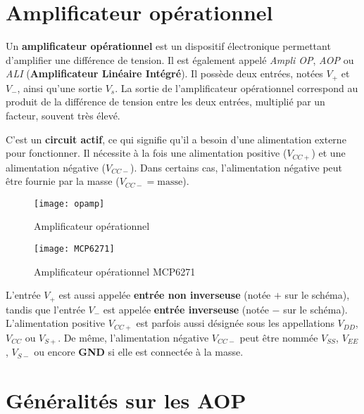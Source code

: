 \section{Amplificateur opérationnel}\label{electroniqueOpamp}

Un \textbf{amplificateur opérationnel} est un dispositif électronique permettant 
d'amplifier une différence de tension. Il est également appelé \textit{Ampli OP}, 
\textit{AOP} ou \textit{ALI} (\textbf{Amplificateur Linéaire Intégré}). Il 
possède deux entrées, notées \(V_+\) et \(V_-\), ainsi qu'une sortie 
\(V_s\). La sortie de l'amplificateur opérationnel correspond au produit de 
la différence de tension entre les deux entrées, multiplié par un facteur, 
souvent très élevé.

C'est un \textbf{circuit actif}, ce qui signifie qu'il a besoin d'une 
alimentation externe pour fonctionner. Il nécessite à la fois une alimentation 
positive (\(V_{CC+}\)) et une alimentation négative (\(V_{CC-}\)). Dans 
certains cas, l'alimentation négative peut être fournie par la masse 
(\(V_{CC-} = \text{masse}\)).


\begin{minipage}{0.49\textwidth}
    \begin{figure}[H]
        \centering
        \texttt{[image: opamp]}
        \caption{Amplificateur opérationnel}
        \label{figOpamp}
    \end{figure}
\end{minipage}
\begin{minipage}{0.5\textwidth}
    \begin{figure}[H]
        \centering
        \texttt{[image: MCP6271]}
        \caption{Amplificateur opérationnel MCP6271}
        \label{figOpampSymbol}
    \end{figure}
\end{minipage}

L'entrée \(V_+\) est aussi appelée \textbf{entrée non inverseuse} (notée 
\(+\) sur le schéma), tandis que l'entrée \(V_-\) est appelée 
\textbf{entrée inverseuse} (notée \(-\) sur le schéma). L'alimentation 
positive \(V_{CC+}\) est parfois aussi désignée sous les appellations
\(V_{DD}\), \(V_{CC}\) ou \(V_{S+}\). De même, l'alimentation négative 
\(V_{CC-}\) peut être nommée \(V_{SS}\), \(V_{EE}\), \(V_{S-}\) ou 
encore \textbf{GND} si elle est connectée à la masse.

\section{Généralités sur les AOP}

